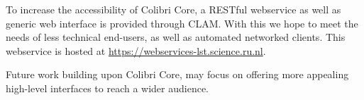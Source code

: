 \documentclass[a4paper,12pt]{article}
\begin{document}
To increase the accessibility of Colibri Core, a RESTful webservice as well as
generic web interface is provided through CLAM\cite{CLAMPAPER}. With this we
hope to meet the needs of less technical end-users, as well as automated
networked clients. This webservice is hosted at
\url{https://webservices-lst.science.ru.nl}.

Future work building upon Colibri Core, may focus on offering more appealing
high-level interfaces to reach a wider audience.





\end{document}
